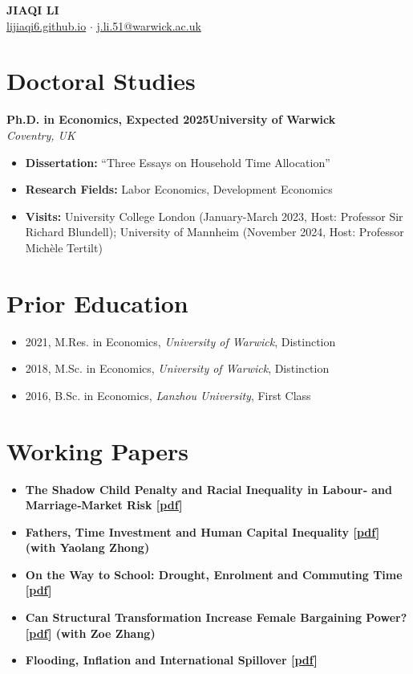 \documentclass[11pt,a4paper]{article}
\newcommand{\cventry}[4]{
    \noindent\textbf{#1}\hfill\textbf{#2} \\
    \textit{#3}\hfill\textit{#4}
    \vspace{0.2em}
}
\newcommand{\cvitem}[2]{
    \item \textbf{#1} \\ #2
}
\begin{document}
\begin{center}
    {\Huge\bfseries JIAQI LI} \\
    \vspace{0.3em}
    \href{https://lijiaqi6.github.io/}{lijiaqi6.github.io} $\cdot$ \href{mailto:j.li.51@warwick.ac.uk}{j.li.51@warwick.ac.uk}
\end{center}
\vspace{1em}

\section{Doctoral Studies}
\cventry{Ph.D. in Economics, Expected 2025}{University of Warwick}{Coventry, UK}{}
\vspace{-0.5em}
\begin{itemize}[leftmargin=*, itemsep=0.2em]
    \item[] \textbf{Dissertation:} ``Three Essays on Household Time Allocation''
    \item[] \textbf{Research Fields:} Labor Economics, Development Economics
    \item[] \textbf{Visits:} University College London (January-March 2023, Host: Professor Sir Richard Blundell); University of Mannheim (November 2024, Host: Professor Michèle Tertilt)
\end{itemize}

\section{Prior Education}
\begin{itemize}[leftmargin=*, itemsep=0.2em]
    \item 2021, M.Res. in Economics, \textit{University of Warwick}, Distinction
    \item 2018, M.Sc. in Economics, \textit{University of Warwick}, Distinction
    \item 2016, B.Sc. in Economics, \textit{Lanzhou University}, First Class
\end{itemize}

\section{Working Papers}
\begin{itemize}[leftmargin=*, itemsep=0.3em]
    \cvitem{The Shadow Child Penalty and Racial Inequality in Labour‑ and Marriage‑Market Risk [\href{https://lijiaqi6.github.io/li_race.pdf}{pdf}]}{}
    \cvitem{Fathers, Time Investment and Human Capital Inequality [\href{https://lijiaqi6.github.io/Father.pdf}{pdf}] (with Yaolang Zhong)}{}
    \cvitem{On the Way to School: Drought, Enrolment and Commuting Time [\href{https://lijiaqi6.github.io/Drought.pdf}{pdf}]}{}
    \cvitem{Can Structural Transformation Increase Female Bargaining Power? [\href{https://papers.ssrn.com/sol3/papers.cfm?abstract_id=4955252}{pdf}] (with Zoe Zhang)}{}
    \cvitem{Flooding, Inflation and International Spillover [\href{https://papers.ssrn.com/sol3/papers.cfm?abstract_id=4816569}{pdf}]}{}
\end{itemize}
\end{document}
